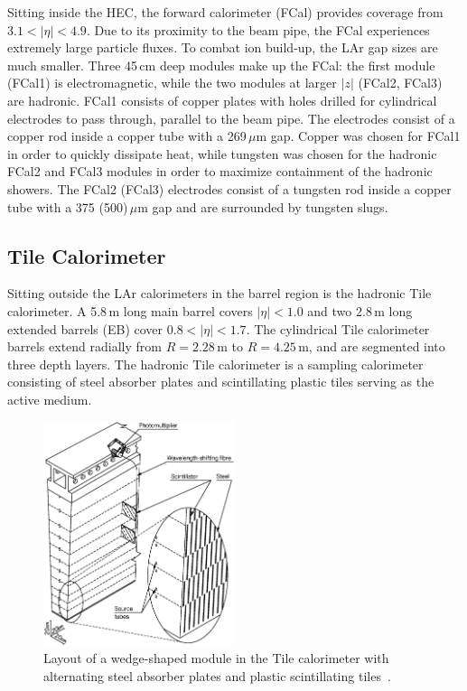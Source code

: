 Sitting inside the HEC, the forward calorimeter (FCal) provides coverage from $3.1<|\eta|<4.9$. Due to its proximity to the beam pipe, the FCal experiences extremely large particle fluxes. To combat ion build-up, the LAr gap sizes are much smaller. Three 45\,cm deep modules make up the FCal: the first module (FCal1) is electromagnetic, while the two modules at larger $|z|$ (FCal2, FCal3) are hadronic. 
FCal1 consists of copper plates with holes drilled for cylindrical electrodes to pass through, parallel to the beam pipe. The electrodes consist of a copper rod inside a copper tube with a 269\,$\mu$m gap. Copper was chosen for FCal1 in order to quickly dissipate heat, while tungsten was chosen for the hadronic FCal2 and FCal3 modules in order to maximize containment of the hadronic showers. The FCal2 (FCal3) electrodes consist of a tungsten rod inside a copper tube with a 375 (500)\,$\mu$m gap and are surrounded by tungsten slugs. 

%
\subsection{Tile Calorimeter}

Sitting outside the LAr calorimeters in the barrel region is the hadronic Tile calorimeter. A 5.8\,m long main barrel covers $|\eta|<1.0$ and two 2.8\,m long extended barrels (EB) cover $0.8<|\eta|<1.7$. The cylindrical Tile calorimeter barrels extend radially from $R=2.28$\,m to $R=4.25$\,m, and are segmented into three depth layers. The hadronic Tile calorimeter is a sampling calorimeter consisting of steel absorber plates and scintillating plastic tiles serving as the active medium.

\begin{figure}
\begin{center}
\includegraphics[width=0.5\textwidth]{figures/ATLAS/TileCal_Module}
\caption[Tile calorimeter module]{Layout of a wedge-shaped module in the Tile calorimeter with alternating steel absorber plates and plastic scintillating tiles~\cite{ATLAS}.}
\label{fig:tilecal}
\end{center}
\end{figure}


